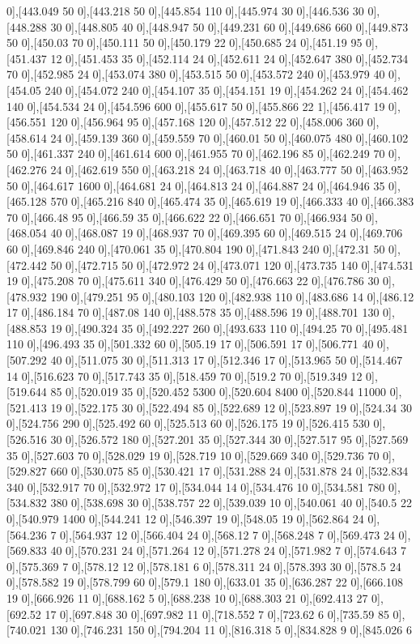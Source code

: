 {0],[443.049 50 0],[443.218 50 0],[445.854 110 0],[445.974 30 0],[446.536 30 0],[448.288 30 0],[448.805 40 0],[448.947 50 0],[449.231 60 0],[449.686 660 0],[449.873 50 0],[450.03 70 0],[450.111 50 0],[450.179 22 0],[450.685 24 0],[451.19 95 0],[451.437 12 0],[451.453 35 0],[452.114 24 0],[452.611 24 0],[452.647 380 0],[452.734 70 0],[452.985 24 0],[453.074 380 0],[453.515 50 0],[453.572 240 0],[453.979 40 0],[454.05 240 0],[454.072 240 0],[454.107 35 0],[454.151 19 0],[454.262 24 0],[454.462 140 0],[454.534 24 0],[454.596 600 0],[455.617 50 0],[455.866 22 1],[456.417 19 0],[456.551 120 0],[456.964 95 0],[457.168 120 0],[457.512 22 0],[458.006 360 0],[458.614 24 0],[459.139 360 0],[459.559 70 0],[460.01 50 0],[460.075 480 0],[460.102 50 0],[461.337 240 0],[461.614 600 0],[461.955 70 0],[462.196 85 0],[462.249 70 0],[462.276 24 0],[462.619 550 0],[463.218 24 0],[463.718 40 0],[463.777 50 0],[463.952 50 0],[464.617 1600 0],[464.681 24 0],[464.813 24 0],[464.887 24 0],[464.946 35 0],[465.128 570 0],[465.216 840 0],[465.474 35 0],[465.619 19 0],[466.333 40 0],[466.383 70 0],[466.48 95 0],[466.59 35 0],[466.622 22 0],[466.651 70 0],[466.934 50 0],[468.054 40 0],[468.087 19 0],[468.937 70 0],[469.395 60 0],[469.515 24 0],[469.706 60 0],[469.846 240 0],[470.061 35 0],[470.804 190 0],[471.843 240 0],[472.31 50 0],[472.442 50 0],[472.715 50 0],[472.972 24 0],[473.071 120 0],[473.735 140 0],[474.531 19 0],[475.208 70 0],[475.611 340 0],[476.429 50 0],[476.663 22 0],[476.786 30 0],[478.932 190 0],[479.251 95 0],[480.103 120 0],[482.938 110 0],[483.686 14 0],[486.12 17 0],[486.184 70 0],[487.08 140 0],[488.578 35 0],[488.596 19 0],[488.701 130 0],[488.853 19 0],[490.324 35 0],[492.227 260 0],[493.633 110 0],[494.25 70 0],[495.481 110 0],[496.493 35 0],[501.332 60 0],[505.19 17 0],[506.591 17 0],[506.771 40 0],[507.292 40 0],[511.075 30 0],[511.313 17 0],[512.346 17 0],[513.965 50 0],[514.467 14 0],[516.623 70 0],[517.743 35 0],[518.459 70 0],[519.2 70 0],[519.349 12 0],[519.644 85 0],[520.019 35 0],[520.452 5300 0],[520.604 8400 0],[520.844 11000 0],[521.413 19 0],[522.175 30 0],[522.494 85 0],[522.689 12 0],[523.897 19 0],[524.34 30 0],[524.756 290 0],[525.492 60 0],[525.513 60 0],[526.175 19 0],[526.415 530 0],[526.516 30 0],[526.572 180 0],[527.201 35 0],[527.344 30 0],[527.517 95 0],[527.569 35 0],[527.603 70 0],[528.029 19 0],[528.719 10 0],[529.669 340 0],[529.736 70 0],[529.827 660 0],[530.075 85 0],[530.421 17 0],[531.288 24 0],[531.878 24 0],[532.834 340 0],[532.917 70 0],[532.972 17 0],[534.044 14 0],[534.476 10 0],[534.581 780 0],[534.832 380 0],[538.698 30 0],[538.757 22 0],[539.039 10 0],[540.061 40 0],[540.5 22 0],[540.979 1400 0],[544.241 12 0],[546.397 19 0],[548.05 19 0],[562.864 24 0],[564.236 7 0],[564.937 12 0],[566.404 24 0],[568.12 7 0],[568.248 7 0],[569.473 24 0],[569.833 40 0],[570.231 24 0],[571.264 12 0],[571.278 24 0],[571.982 7 0],[574.643 7 0],[575.369 7 0],[578.12 12 0],[578.181 6 0],[578.311 24 0],[578.393 30 0],[578.5 24 0],[578.582 19 0],[578.799 60 0],[579.1 180 0],[633.01 35 0],[636.287 22 0],[666.108 19 0],[666.926 11 0],[688.162 5 0],[688.238 10 0],[688.303 21 0],[692.413 27 0],[692.52 17 0],[697.848 30 0],[697.982 11 0],[718.552 7 0],[723.62 6 0],[735.59 85 0],[740.021 130 0],[746.231 150 0],[794.204 11 0],[816.318 5 0],[834.828 9 0],[845.026 6 }

